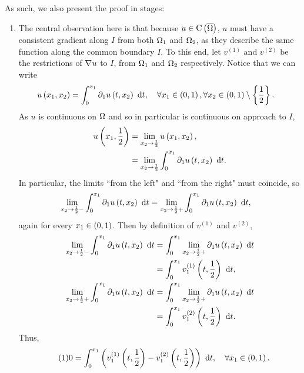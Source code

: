 \documentclass[11pt]{report}
\newcommand\labelthis{\addtocounter{equation}{1}\tag{\theequation}}
\theoremstyle{plain}
\begin{document}
As such, we also present the proof in stages:
\begin{enumerate}
	\item The central observation here is that because $u\in\mathrm{C}\left( \overline{\Omega} \right)$, $u$ must have a consistent gradient along $I$ from both $\Omega_1$ and $\Omega_2$, as they describe the same function along the common boundary $I$.
	To this end, let $v^{(1)}$ and $v^{(2)}$ be the restrictions of $\nabla u$ to $I$, from $\Omega_1$ and $\Omega_2$ respectively.
	Notice that we can write
	\begin{align*}
		u\bracs{x_1,x_2} &= \int_0^{x_1} \partial_1 u\bracs{t,x_2} \ \md t,
		\quad \forall x_1\in\bracs{0,1}, \forall x_2\in\bracs{0,1}\setminus\clbracs{\recip{2}}.
	\end{align*}
	As $u$ is continuous on $\Omega$ and so in particular is continuous on approach to $I$,
	\begin{align*}
		u\left( x_1,\frac{1}{2} \right) &= \lim_{x_2\rightarrow \frac{1}{2}} u\left( x_1,x_2 \right), \\
		&= \lim_{x_2\rightarrow\frac{1}{2}} \int_0^{x_1} \partial_1 u\left( t,x_2 \right) \ \mathrm{d} t.
	\end{align*}
	In particular, the limits ``from the left" and ``from the right" must coincide, so
	\begin{align*}
		\lim_{x_2\rightarrow\frac{1}{2}-} \int_0^{x_1} \partial_1 u\left( t,x_2 \right) \ \mathrm{d} t 
		&= \lim_{x_2\rightarrow\frac{1}{2}+} \int_0^{x_1} \partial_1 u\left( t,x_2 \right) \ \mathrm{d} t,
	\end{align*}
	again for every $x_1\in\left( 0,1 \right)$.
	Then by definition of $v^{(1)}$ and $v^{(2)}$,
	\begin{align*}
		\lim_{x_2\rightarrow\frac{1}{2}-} \int_0^{x_1} \partial_1 u\left( t,x_2 \right) \ \mathrm{d} t
		&= \int_0^{x_1} \lim_{x_2\rightarrow\frac{1}{2}+}\partial_1 u\left( t,x_2 \right) \ \mathrm{d} t \\
		&= \int_0^{x_1} v^{(1)}_1\left( t,\frac{1}{2} \right) \ \mathrm{d} t, \\
		\lim_{x_2\rightarrow\frac{1}{2}+} \int_0^{x_1} \partial_1 u\left( t,x_2 \right) \ \mathrm{d} t
		&= \int_0^{x_1} \lim_{x_2\rightarrow\frac{1}{2}+}\partial_1 u\left( t,x_2 \right) \ \mathrm{d} t \\
		&= \int_0^{x_1} v^{(2)}_1\left( t,\frac{1}{2} \right) \ \mathrm{d} t.	
	\end{align*}
	Thus,
	\begin{align*} \labelthis\label{eq:TraceIntegrals}
		0 &= \int_0^{x_1} \bracs{v^{(1)}_1\bracs{t,\recip{2}} - v^{(2)}_1\bracs{t,\recip{2}}} \ \md t,
		\quad \forall x_1\in\bracs{0,1}.
	\end{align*}

\end{enumerate}
\end{document}
